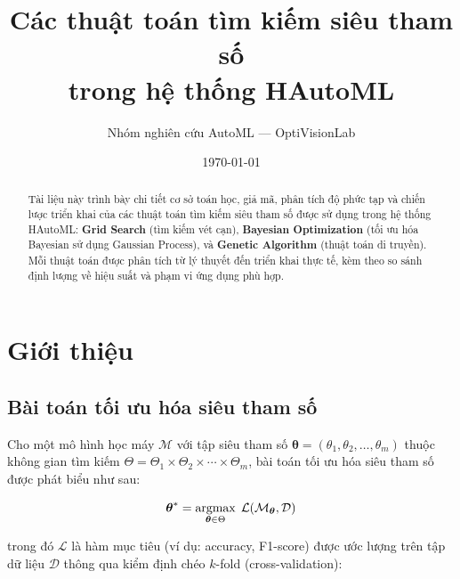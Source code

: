 \documentclass[12pt,a4paper]{article}
\newcommand{\argmax}{\operatornamewithlimits{argmax}}
\begin{document}
\title{%
    \textbf{Các thuật toán tìm kiếm siêu tham số\\trong hệ thống HAutoML}
}
\author{Nhóm nghiên cứu AutoML --- OptiVisionLab}
\date{\today}
\maketitle

\begin{abstract}
Tài liệu này trình bày chi tiết cơ sở toán học, giả mã, phân tích độ phức tạp
và chiến lược triển khai của các thuật toán tìm kiếm siêu tham số được sử dụng
trong hệ thống HAutoML: \textbf{Grid Search} (tìm kiếm vét cạn),
\textbf{Bayesian Optimization} (tối ưu hóa Bayesian sử dụng Gaussian Process),
và \textbf{Genetic Algorithm} (thuật toán di truyền). Mỗi thuật toán được phân
tích từ lý thuyết đến triển khai thực tế, kèm theo so sánh định lượng về hiệu
suất và phạm vi ứng dụng phù hợp.
\end{abstract}

\tableofcontents
\newpage

\section{Giới thiệu}
\label{sec:introduction}

\subsection{Bài toán tối ưu hóa siêu tham số}

Cho một mô hình học máy $\mathcal{M}$ với tập siêu tham số
$\boldsymbol{\theta} = (\theta_1, \theta_2, \ldots, \theta_m)$ thuộc không gian
tìm kiếm $\Theta = \Theta_1 \times \Theta_2 \times \cdots \times \Theta_m$,
bài toán tối ưu hóa siêu tham số được phát biểu như sau:

\begin{equation}
    \boldsymbol{\theta}^* = \argmax_{\boldsymbol{\theta} \in \Theta}\;
    \mathcal{L}\!\left(\mathcal{M}_{\boldsymbol{\theta}}, \mathcal{D}\right)
    \label{eq:hpo_problem}
\end{equation}

\noindent trong đó $\mathcal{L}$ là hàm mục tiêu (ví dụ: accuracy, F1-score)
được ước lượng trên tập dữ liệu $\mathcal{D}$ thông qua kiểm định chéo
$k$-fold (cross-validation):
\end{document}
